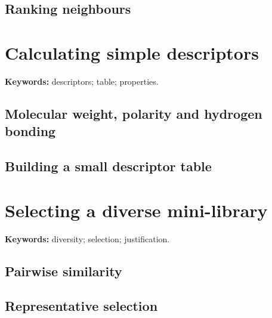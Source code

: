 
\subsection{Ranking neighbours}


\section{Calculating simple descriptors}

\begin{resultbox}
\textbf{Keywords:} descriptors; table; properties.
\end{resultbox}

\subsection{Molecular weight, polarity and hydrogen bonding}


\subsection{Building a small descriptor table}


\section{Selecting a diverse mini-library}

\begin{insightbox}
\textbf{Keywords:} diversity; selection; justification.
\end{insightbox}

\subsection{Pairwise similarity}


\subsection{Representative selection}

